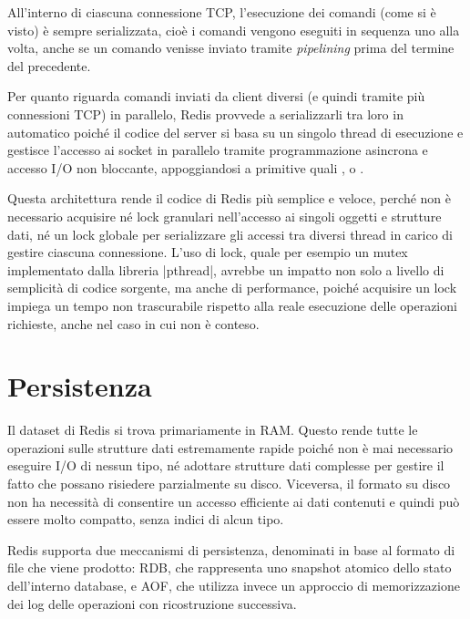 All'interno di ciascuna connessione TCP, l'esecuzione dei comandi (come si è visto) è sempre
serializzata, cioè i comandi vengono eseguiti in sequenza uno alla volta, anche se un comando
venisse inviato tramite \emph{pipelining} prima del termine del precedente.

Per quanto riguarda comandi inviati da client diversi (e quindi tramite più connessioni TCP) in
parallelo, Redis provvede a serializzarli tra loro in automatico poiché il codice del server si
basa su un singolo thread di esecuzione e gestisce l'accesso ai socket in parallelo tramite
programmazione asincrona e accesso I/O non bloccante, appoggiandosi a primitive quali 
,
 o 
.

Questa architettura rende il codice di Redis più semplice e veloce, perché non è necessario
acquisire né lock granulari nell'accesso ai singoli oggetti e strutture dati, né un lock globale per
serializzare gli accessi tra diversi thread in carico di gestire ciascuna connessione. L'uso di lock,
quale per esempio un mutex implementato dalla libreria \cverb|pthread|, avrebbe un impatto non
solo a livello di semplicità di codice sorgente, ma anche di performance, poiché acquisire un lock
impiega un tempo non trascurabile rispetto alla reale esecuzione delle operazioni richieste, anche
nel caso in cui non è conteso.

\section{Persistenza}
\label{sec:redis:persistence}

Il dataset di Redis si trova primariamente in RAM. Questo rende tutte le operazioni sulle strutture
dati estremamente rapide poiché non è mai necessario eseguire I/O di nessun tipo, né adottare
strutture dati complesse per gestire il fatto che possano risiedere parzialmente su disco.
Viceversa, il formato su disco non ha necessità di consentire un accesso efficiente ai dati
contenuti e quindi può essere molto compatto, senza indici di alcun tipo.

Redis supporta due meccanismi di persistenza, denominati in base al formato di file che viene
prodotto: RDB, che rappresenta uno snapshot atomico dello stato dell'interno database, e AOF, che
utilizza invece un approccio di memorizzazione dei log delle operazioni con ricostruzione
successiva.

